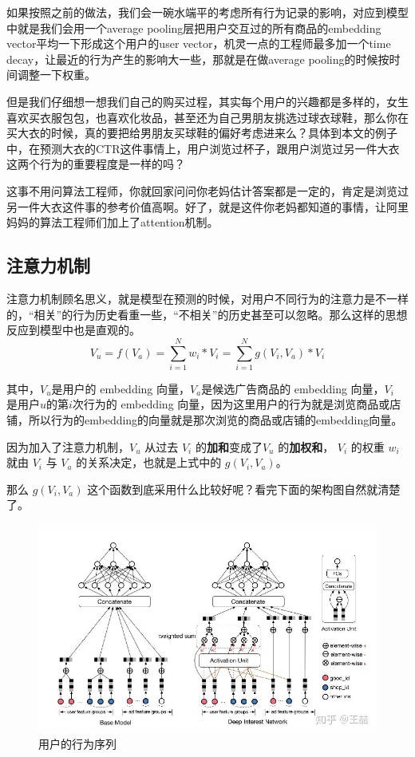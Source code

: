 \documentclass[12pt]{article}
\begin{document}
\begin{framed}
如果按照之前的做法，我们会一碗水端平的考虑所有行为记录的影响，对应到模型中就是我们会用一个average pooling层把用户交互过的所有商品的embedding vector平均一下形成这个用户的user vector，机灵一点的工程师最多加一个time decay，让最近的行为产生的影响大一些，那就是在做average pooling的时候按时间调整一下权重。

但是我们仔细想一想我们自己的购买过程，其实每个用户的兴趣都是多样的，女生喜欢买衣服包包，也喜欢化妆品，甚至还为自己男朋友挑选过球衣球鞋，那么你在买大衣的时候，真的要把给男朋友买球鞋的偏好考虑进来么？具体到本文的例子中，在预测大衣的CTR这件事情上，用户浏览过杯子，跟用户浏览过另一件大衣这两个行为的重要程度是一样的吗？

这事不用问算法工程师，你就回家问问你老妈估计答案都是一定的，肯定是浏览过另一件大衣这件事的参考价值高啊。好了，就是这件你老妈都知道的事情，让阿里妈妈的算法工程师们加上了attention机制。
\end{framed}

\subsection{注意力机制}
注意力机制顾名思义，就是模型在预测的时候，对用户不同行为的注意力是不一样的，“相关”的行为历史看重一些，“不相关”的历史甚至可以忽略。那么这样的思想反应到模型中也是直观的。
$$
V_u  = f(V_a) = \sum_{i=1}^Nw_i * V_i = \sum_{i=1}^Ng(V_i, V_a) * V_i
$$

其中，$V_u$是用户的 embedding 向量，$V_a$是候选广告商品的 embedding 向量，$V_i$ 是用户$u$的第$i$次行为的 embedding 向量，因为这里用户的行为就是浏览商品或店铺，所以行为的embedding的向量就是那次浏览的商品或店铺的embedding向量。

因为加入了注意力机制，$V_u$ 从过去 $V_i$ 的\textbf{加和}变成了$V_u$ 的\textbf{加权和}， $V_i$ 的权重 $w_i$ 就由 $V_i$ 与 $V_a$ 的关系决定，也就是上式中的 $g(V_i, V_a)$。

那么 $g(V_i, V_a)$ 这个函数到底采用什么比较好呢？看完下面的架构图自然就清楚了。
\begin{figure}[H]
    \centering
    \includegraphics[width=1\textwidth]{fig/Ali_DIN_Structure.jpg}
    \caption{用户的行为序列}
\end{figure}
\end{document}
